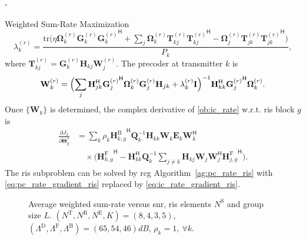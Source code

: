 \documentclass[journal]{IEEEtran}
\begin{document}
\begin{section}{-}
\begin{subsection}{Weighted Sum-Rate Maximization}
		\begin{equation}
			\lambda_k^{(r)} = \frac{\mathrm{tr}\bigl(\eta \mathbf{\Omega}_k^{(r)} \mathbf{G}_k^{(r)}{\mathbf{G}_k^{(r)}}^\mathsf{H} + \sum_j \mathbf{\Omega}_k^{(r)}\mathbf{T}_{kj}^{(r)} {\mathbf{T}_{kj}^{(r)}}^\mathsf{H} - \mathbf{\Omega}_j^{(r)}\mathbf{T}_{jk}^{(r)} {\mathbf{T}_{jk}^{(r)}}^\mathsf{H} \bigr)}{P_k},
		\end{equation}
		where $\mathbf{T}_{kj}^{(r)} = \mathbf{G}_k^{(r)} \mathbf{H}_{kj} \mathbf{W}_j^{(r)}$.
		The precoder at transmitter $k$ is
		\begin{equation}
			\mathbf{W}_k^{(r)} = \Bigl(\sum_j \mathbf{H}_{jk}^\mathsf{H} {\mathbf{G}_j^{(r)}}^\mathsf{H} \mathbf{\Omega}_k^{(r)} \mathbf{G}_j^{(r)} \mathbf{H}_{jk} + \lambda_k^{(r)} \mathbf{I} \Bigr)^{-1} \mathbf{H}_{kk}^\mathsf{H} {\mathbf{G}_j^{(r)}}^\mathsf{H} \mathbf{\Omega}_k^{(r)}.
		\end{equation}
		Once $\{\mathbf{W}_k\}$ is determined, the complex derivative of \eqref{ob:ic_rate} w.r.t. \gls{ris} block $g$ is
		\begin{equation}
			\begin{split}
				\frac{\partial J_2}{\partial \mathbf{\Theta}_g^*}
				& = \sum_k \rho_k {\mathbf{H}_{k,g}^\mathrm{B}}^\mathsf{H} \mathbf{Q}_k^{-1} \mathbf{H}_{kk} \mathbf{W}_k \mathbf{E}_k \mathbf{W}_k^\mathsf{H} \\
				& \quad \times \bigl({\mathbf{H}_{k,g}^\mathrm{F}}^\mathsf{H} - \mathbf{H}_{kk}^\mathsf{H} \mathbf{Q}_k^{-1} \sum_{j \ne k} \mathbf{H}_{kj} \mathbf{W}_j \mathbf{W}_j^\mathsf{H} {\mathbf{H}_{j,g}^\mathrm{F}}^\mathsf{H}\bigr).
			\end{split}
			\label{eq:ic_rate_gradient_ris}
		\end{equation}
		The \gls{ris} subproblem can be solved by \gls{rcg} Algorithm~\ref{ag:pc_rate_ris} with \eqref{eq:pc_rate_gradient_ris} replaced by \eqref{eq:ic_rate_gradient_ris}.

		\begin{figure}[!t]
			\centering
			\resizebox{0.65\columnwidth}{!}{
				
			}
			\caption{Average weighted sum-rate versus \gls{snr}, \gls{ris} elements $N^\mathrm{S}$ and group size $L$. $(N^\mathrm{T}, N^\mathrm{R}, N^\mathrm{E}, K) = (8, 4, 3, 5)$, $(\Lambda^\mathrm{D}, \Lambda^\mathrm{F}, \Lambda^\mathrm{B}) = (65, 54, 46) \unit{dB}$, $\rho_k = 1, \ \forall k$.}
			\label{sm:ic_rate_sx}
		\end{figure}


\end{subsection}
\end{section}
\end{document}
